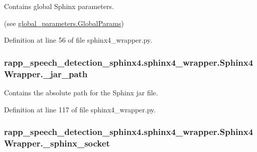 Contains global Sphinx parameters. 

(see \hyperlink{classrapp__speech__detection__sphinx4_1_1global__parameters_1_1GlobalParams}{global\-\_\-parameters.\-Global\-Params}) 

Definition at line 56 of file sphinx4\-\_\-wrapper.\-py.

\hypertarget{classrapp__speech__detection__sphinx4_1_1sphinx4__wrapper_1_1Sphinx4Wrapper_af920761cb98e95d75da0585cf69f0245}{
\subsubsection[{\-\_\-jar\-\_\-path}]{\setlength{\rightskip}{0pt plus 5cm}rapp\-\_\-speech\-\_\-detection\-\_\-sphinx4.\-sphinx4\-\_\-wrapper.\-Sphinx4\-Wrapper.\-\_\-jar\-\_\-path\hspace{0.3cm}{\ttfamily [private]}}}\label{classrapp__speech__detection__sphinx4_1_1sphinx4__wrapper_1_1Sphinx4Wrapper_af920761cb98e95d75da0585cf69f0245}


Contains the absolute path for the Sphinx jar file. 



Definition at line 117 of file sphinx4\-\_\-wrapper.\-py.

\hypertarget{classrapp__speech__detection__sphinx4_1_1sphinx4__wrapper_1_1Sphinx4Wrapper_a99f828ccad07d66025d905bb2f42e2a0}{
\subsubsection[{\-\_\-sphinx\-\_\-socket}]{\setlength{\rightskip}{0pt plus 5cm}rapp\-\_\-speech\-\_\-detection\-\_\-sphinx4.\-sphinx4\-\_\-wrapper.\-Sphinx4\-Wrapper.\-\_\-sphinx\-\_\-socket\hspace{0.3cm}{\ttfamily [private]}}}\label{classrapp__speech__detection__sphinx4_1_1sphinx4__wrapper_1_1Sphinx4Wrapper_a99f828ccad07d66025d905bb2f42e2a0}


